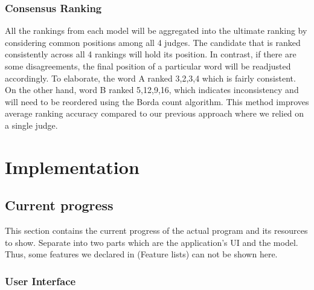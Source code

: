\documentclass[12pt,oneside,openright,a4paper]{cpe-english-project}
\begin{document}
\subsection{Consensus Ranking}
All the rankings from each model will be aggregated into the ultimate ranking by considering common positions among all 4 judges. The candidate that is ranked consistently across all 4 rankings will hold its position. In contrast, if there are some disagreements, the final position of a particular word will be readjusted accordingly. To elaborate, the word A ranked 3,2,3,4 which is fairly consistent. On the other hand, word B ranked 5,12,9,16, which indicates inconsistency and will need to be reordered using the Borda count algorithm.  This method improves average ranking accuracy compared to our previous approach where we relied on a single judge.  





\chapter{Implementation}

\section{Current progress}
This section contains the current progress of the actual program and its resources to show. Separate into two parts which are the application’s UI and the model. Thus, some features we declared in (Feature lists) can not be shown here.

\subsection{User Interface} \label{subsec:ui}
\end{document}
